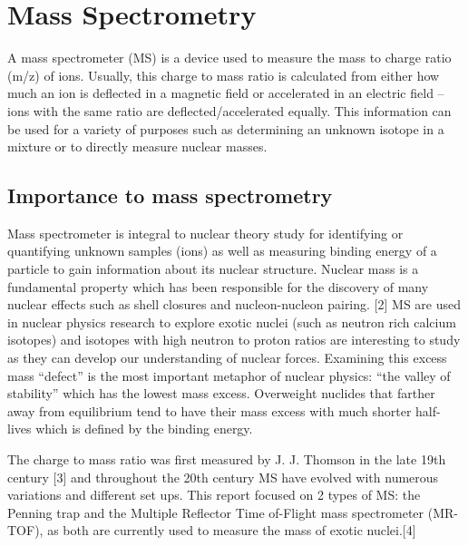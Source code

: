 \section{Mass Spectrometry}
A mass spectrometer (MS) is a device used to measure the mass to charge ratio (m/z) of ions.
Usually, this charge to mass ratio is calculated from either how much an ion is deflected in a magnetic field or accelerated in an electric field – ions with the same ratio are deflected/accelerated equally.
This information can be used for a variety of purposes such as determining an unknown isotope in a mixture or to directly measure nuclear masses.

\subsection{Importance to mass spectrometry}
Mass spectrometer is integral to nuclear theory study for identifying or quantifying unknown samples (ions) as well as measuring binding energy of a particle to gain information about its nuclear structure.
Nuclear mass is a fundamental property which has been responsible for the discovery of many nuclear effects such as shell closures and nucleon-nucleon pairing.
[2] MS are used in nuclear physics research to explore exotic nuclei (such as neutron rich calcium isotopes) and isotopes with high neutron to proton ratios are interesting to study as they can develop our understanding of nuclear forces.
Examining this excess mass “defect” is the most important metaphor of nuclear physics: “the valley of stability” which has the lowest mass excess.
Overweight nuclides that farther away from equilibrium tend to have their mass excess with much shorter half-lives which is defined by the binding energy.

The charge to mass ratio was first measured by J. J. Thomson in the late 19th century [3] and throughout the 20th century MS have evolved with numerous variations and different set ups.
This report focused on 2 types of MS: the Penning trap and the Multiple Reflector Time of-Flight mass spectrometer (MR-TOF), as both are currently used to measure the mass of exotic nuclei.[4]

